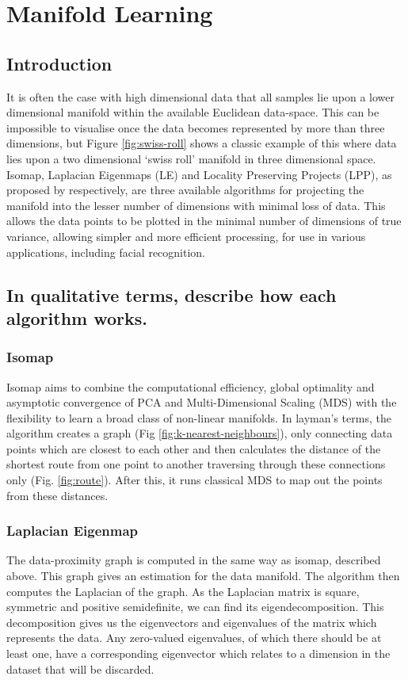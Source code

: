 \documentclass{article}
\begin{document}
\newpage
\section{Manifold Learning}
\subsection{Introduction}
It is often the case with high dimensional data that all samples lie upon a lower dimensional manifold within the available Euclidean data-space. This can be impossible to visualise once the data becomes represented by more than three dimensions, but Figure \ref{fig:swiss-roll} shows a classic example of this where data lies upon a two dimensional `swiss roll' manifold in three dimensional space. Isomap, Laplacian Eigenmaps (LE) and Locality Preserving Projects (LPP), as proposed by \cite{isomap, le, lpp} respectively, are three available algorithms for projecting the manifold into the lesser number of dimensions with minimal loss of data. This allows the data points to be plotted in the minimal number of dimensions of true variance, allowing simpler and more efficient processing, for use in various applications, including facial recognition.

\subsection{In qualitative terms, describe how each algorithm works.}
\subsubsection{Isomap}
Isomap aims to combine the computational efficiency, global optimality and asymptotic convergence of PCA and Multi-Dimensional Scaling (MDS) with the flexibility to learn a broad class of non-linear manifolds\cite{isomap}. In layman's terms, the algorithm creates a graph (Fig \ref{fig:k-nearest-neighbours}), only connecting data points which are closest to each other and then calculates the distance of the shortest route from one point to another traversing through these connections only (Fig. \ref{fig:route}). After this, it runs classical MDS to map out the points from these distances.

\subsubsection{Laplacian Eigenmap}
The data-proximity graph is computed in the same way as isomap, described above. This graph gives an estimation for the data manifold. The algorithm then computes the Laplacian of the graph. As the Laplacian matrix is square, symmetric and positive semidefinite, we can find its eigendecomposition. This decomposition gives us the eigenvectors and eigenvalues of the matrix which represents the data. Any zero-valued eigenvalues, of which there should be at least one, have a corresponding eigenvector which relates to a dimension in the dataset that will be discarded.
\end{document}
